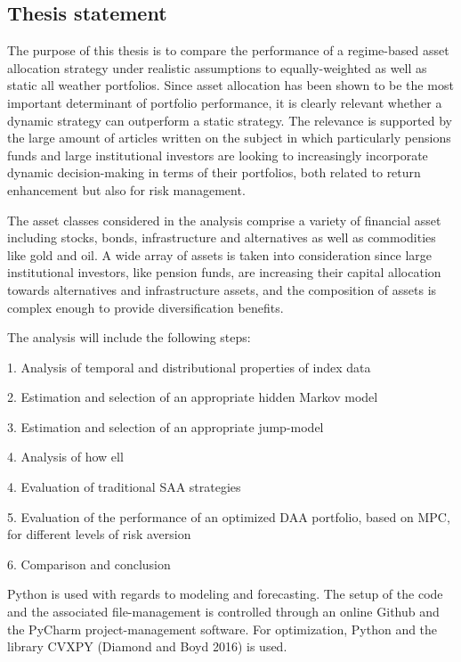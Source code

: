 \subsection{Thesis statement}
The purpose of this thesis is to compare the performance of a regime-based asset allocation strategy under realistic assumptions to equally-weighted as well as static all weather portfolios. Since asset allocation has been shown to be the most important determinant of portfolio performance, it is clearly relevant whether a dynamic strategy can outperform a static strategy. The relevance is supported by the large amount of articles written on the subject in which particularly pensions funds and large institutional investors are looking to increasingly incorporate dynamic decision-making in terms of their portfolios, both related to return enhancement but also for risk management.

The asset classes considered in the analysis comprise a variety of financial asset including stocks, bonds, infrastructure and alternatives as well as commodities like gold and oil. A wide array of assets is taken into consideration since large institutional investors, like pension funds, are increasing their capital allocation towards alternatives and infrastructure assets, and the composition of assets is complex enough to provide diversification benefits. 

The analysis will include the following steps:

1. Analysis of temporal and distributional properties of index data

2. Estimation and selection of an appropriate hidden Markov model

3. Estimation and selection of an appropriate jump-model

4. Analysis of how ell

4. Evaluation of traditional SAA strategies

5. Evaluation of the performance of an optimized DAA portfolio, based on MPC, for different levels of risk aversion

6. Comparison and conclusion


Python is used with regards to modeling and forecasting. The setup of the code and the associated file-management is controlled through an online Github and the PyCharm project-management software. For optimization, Python and the library CVXPY (Diamond and Boyd 2016) is used.
